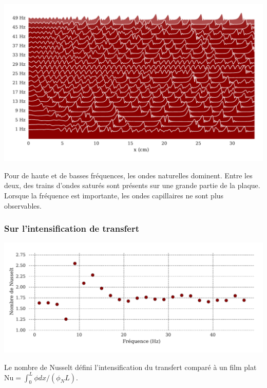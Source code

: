 \documentclass[a0,portrait]{a0poster}
\begin{document}
\begin{multicols}{2}
\begin{multicols}{2}
        \begin{center}
            \includegraphics[width=0.98\columnwidth]{01-frequency_effect}
            \label{fig:freq_effect}
        \end{center}

        Pour de haute et de basses fréquences, les ondes naturelles dominent. Entre les deux, des trains d'ondes saturés sont présents sur une grande partie de la plaque. Lorsque la fréquence est importante, les ondes capillaires ne sont plus observables.

        \columnbreak

        \subsubsection*{Sur l'intensification de transfert}

        \begin{center}
            \includegraphics[width=0.98\columnwidth]{01-Nusselt_freq}
            \label{fig:freq_effect_Nu}
        \end{center}
        Le nombre de Nusselt défini l'intensification du transfert comparé à un film plat $\mathrm{Nu} = \int^L_0 \phi dx / (\phi_N L)$.


\end{multicols}
\end{multicols}
\end{document}
